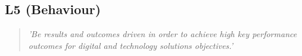 \subsection*{L5 (Behaviour)}

  \begin{quote}
    \textit{'Be results and outcomes driven in order
    to achieve high key performance outcomes for digital and
    technology solutions objectives.'}
  \end{quote}

\newpage